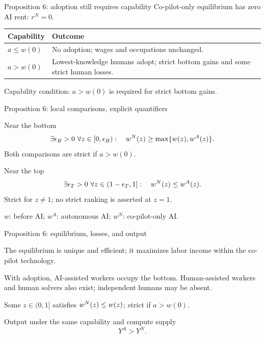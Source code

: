 \documentclass[aspectratio=169,12pt]{beamer}
\begin{document}
\begin{frame}{Proposition 6: adoption still requires capability}
Co-pilot-only equilibrium has zero AI rent: $r^N=0$.
\vspace{5mm}
\begin{center}
\begin{tabular}{l>{\raggedright\arraybackslash}p{8cm}}
\toprule
Capability & Outcome\\\midrule
$a\le w(0)$ & No adoption; wages and occupations unchanged.\\[3mm]
$a>w(0)$ & Lowest-knowledge humans adopt; strict bottom gains and some strict human losses.\\\bottomrule
\end{tabular}
\end{center}
\vspace{4mm}
\alert{Capability condition:} $a>w(0)$ is required for strict bottom gains.
\end{frame}

\begin{frame}{Proposition 6: local comparisons, explicit quantifiers}
\begin{block}{Near the bottom}
\[\exists\epsilon_B>0\ \forall z\in[0,\epsilon_B):
\quad w^{N}(z)\ge\max\{w(z),w^{A}(z)\}.\]
Both comparisons are strict if $a>w(0)$.
\end{block}
\begin{block}{Near the top}
\[\exists\epsilon_T>0\ \forall z\in(1-\epsilon_T,1]:
\quad w^{N}(z)\le w^{A}(z).\]
Strict for $z\ne1$; no strict ranking is asserted at $z=1$.
\end{block}
\medskip
$w$: before AI; $w^A$: autonomous AI; $w^N$: co-pilot-only AI.
\end{frame}

\begin{frame}{Proposition 6: equilibrium, losses, and output}
\begin{points}
\item The equilibrium is unique and efficient; it maximizes labor income within the co-pilot technology.
\item With adoption, AI-assisted workers occupy the bottom. Human-assisted workers and human solvers also exist; independent humans may be absent.
\item Some $z\in(0,1]$ satisfies $w^{N}(z)\le w(z)$; strict if $a>w(0)$.
\end{points}
\begin{block}{Output under the same capability and compute supply}
\[Y^A>Y^N.\]
\end{block}
\end{frame}
\end{document}
